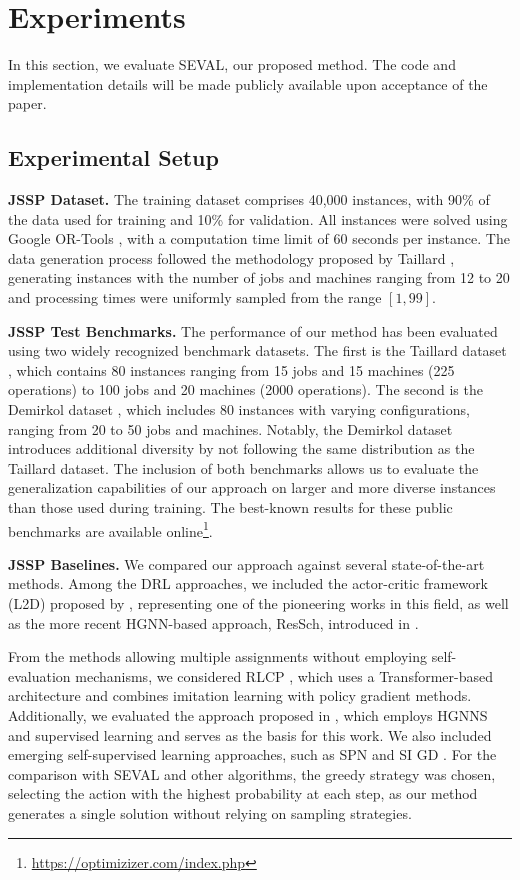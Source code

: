 \section{Experiments}
\label{sec:experiments}

In this section, we evaluate SEVAL, our proposed method. The code and implementation details will be made publicly available upon acceptance of the paper.

\subsection{Experimental Setup}

\textbf{JSSP Dataset.}  
The training dataset comprises 40,000 instances, with 90\% of the data used for training and 10\% for validation. All instances were solved using Google OR-Tools \cite{cpsatlp}, with a computation time limit of 60 seconds per instance. The data generation process followed the methodology proposed by Taillard \cite{taillard1993benchmarks}, generating instances with the number of jobs and machines ranging from 12 to 20 and processing times were uniformly sampled from the range $[1, 99]$.

\textbf{JSSP Test Benchmarks.}  
The performance of our method has been evaluated using two widely recognized benchmark datasets. The first is the Taillard dataset \cite{taillard1993benchmarks}, which contains 80 instances ranging from 15 jobs and 15 machines (225 operations) to 100 jobs and 20 machines (2000 operations). The second is the Demirkol dataset \cite{demirkol1998benchmarks}, which includes 80 instances with varying configurations, ranging from 20 to 50 jobs and machines. Notably, the Demirkol dataset introduces additional diversity by not following the same distribution as the Taillard dataset. The inclusion of both benchmarks allows us to evaluate the generalization capabilities of our approach on larger and more diverse instances than those used during training. The best-known results for these public benchmarks are available online\footnote{\url{https://optimizizer.com/index.php}}. 

\textbf{JSSP Baselines.}  
We compared our approach against several state-of-the-art methods. Among the DRL approaches, we included the actor-critic framework (L2D) proposed by \cite{zhang2020learning}, representing one of the pioneering works in this field, as well as the more recent HGNN-based approach, ResSch, introduced in \cite{ho2024residual}. 

From the methods allowing multiple assignments without employing self-evaluation mechanisms, we considered RLCP \cite{tassel2023end}, which uses a Transformer-based architecture and combines imitation learning with policy gradient methods. Additionally, we evaluated the approach proposed in \cite{echeverria2024multi}, which employs HGNNS and supervised learning and serves as the basis for this work. We also included emerging self-supervised learning approaches, such as SPN \cite{corsini2024self} and SI GD \cite{pirnay2024self}. For the comparison with SEVAL and other algorithms, the greedy strategy was chosen, selecting the action with the highest probability at each step, as our method generates a single solution without relying on sampling strategies.

